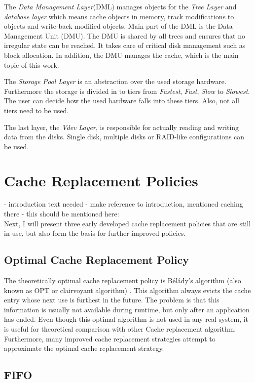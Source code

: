 \documentclass[
	12pt,
	a4paper,
	abstract,
	bibliography=totoc,
	chapterprefix,
	headings=openright,
	numbers=endperiod,
	parskip=half,
	twoside,
]{scrreprt}
\begin{document}
The \emph{Data Management Layer}(DML) manages objects for the \emph{Tree Layer} and \emph{database layer} which means cache objects in memory, 
track modifications to objects and write-back modified objects.
Main part of the DML is the Data Management Unit (DMU).
The DMU is shared by all trees and ensures that no irregular state can be reached.
It takes care of critical disk management such as block allocation.
In addition, the DMU manages the cache, which is the main topic of this work.

The \emph{Storage Pool Layer} is an abstraction over the used storage hardware.
Furthermore the storage is divided in to tiers from \emph{Fastest}, \emph{Fast}, \emph{Slow} to \emph{Slowest}.
The user can decide how the used hardware falls into these tiers. Also, not all tiers need to be used.

The last layer, the \emph{Vdev Layer}, is responsible for actually reading and writing data from the disks.
Single disk, multiple disks or RAID-like configurations can be used.

\section{Cache Replacement Policies}
\label{sec:cache replacement policies}

- introduction text needed
- make reference to introduction, mentioned caching there
- this should be mentioned here:\\
Next, I will present three early developed cache replacement policies that are still in use, but also form the basis for further improved policies.

\subsection{Optimal Cache Replacement Policy}
The theoretically optimal cache replacement policy is Bélády's algorithm (also known as OPT or clairvoyant algorithm) \cite{belady1966study}.
This algorithm always evicts the cache entry whose next use is furthest in the future.
The problem is that this information is usually not available during runtime, but only after an application has ended.
Even though this optimal algorithm is not used in any real system, it is useful for theoretical comparison with other 
Cache replacement algorithm.
Furthermore, many improved cache replacement strategies attempt to approximate the optimal cache replacement strategy.

\subsection{FIFO}
\end{document}
